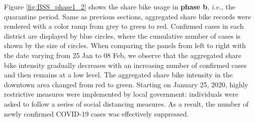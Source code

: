 \documentclass[ijgi,submit,moreauthors,pdftex]{Definitions/mdpi}
\begin{document}
Figure \ref{fig:BSS_phase1_2} shows the share bike usage in \textbf{phase b}, \textit{i.e.,} the quarantine period.
Same as previous sections, aggregated share bike records were rendered with a color ramp from grey to green to red.
Confirmed cases in each district are displayed by blue circles, where the cumulative number of cases is shown by the size of circles.
When comparing the panels from left to right with the date varying from 25 Jan to 08 Feb, we observe that the aggregated share bike intensity gradually decreases with an increasing number of confirmed cases and then remains at a low level.
The aggregated share bike intensity in the downtown area changed from red to green.
Starting on January 25, 2020, highly restrictive measures were implemented by local government: individuals were asked to follow a series of social distancing measures.
As a result, the number of newly confirmed COVID-19 cases was effectively suppressed.
\end{document}

